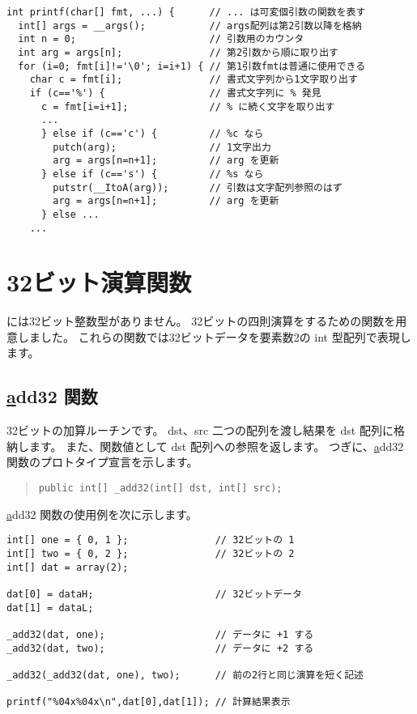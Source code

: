 \begin{mylist}
\begin{verbatim}
int printf(char[] fmt, ...) {      // ... は可変個引数の関数を表す
  int[] args = __args();           // args配列は第2引数以降を格納
  int n = 0;                       // 引数用のカウンタ
  int arg = args[n];               // 第2引数から順に取り出す
  for (i=0; fmt[i]!='\0'; i=i+1) { // 第1引数fmtは普通に使用できる
    char c = fmt[i];               // 書式文字列から1文字取り出す
    if (c=='%') {                  // 書式文字列に % 発見
      c = fmt[i=i+1];              // % に続く文字を取り出す
      ...
      } else if (c=='c') {         // %c なら
        putch(arg);                // 1文字出力
        arg = args[n=n+1];         // arg を更新
      } else if (c=='s') {         // %s なら
        putstr(__ItoA(arg));       // 引数は文字配列参照のはず
        arg = args[n=n+1];         // arg を更新
      } else ...
    ...
\end{verbatim}
\end{mylist}


\section{32ビット演算関数}

\cmml には32ビット整数型がありません。
32ビットの四則演算をするための関数を用意しました。
これらの関数では32ビットデータを要素数2の int 型配列で表現します。

\subsection{\ul add32 関数}

32ビットの加算ルーチンです。
dst、src 二つの配列を渡し結果を dst 配列に格納します。
また、関数値として dst 配列への参照を返します。
つぎに、\ul add32 関数のプロトタイプ宣言を示します。

\begin{quote}
\begin{verbatim}
public int[] _add32(int[] dst, int[] src);
\end{verbatim}
\end{quote}

\ul add32 関数の使用例を次に示します。

\begin{mylist}
\begin{verbatim}
int[] one = { 0, 1 };               // 32ビットの 1
int[] two = { 0, 2 };               // 32ビットの 2
int[] dat = array(2);

dat[0] = dataH;                     // 32ビットデータ
dat[1] = dataL;

_add32(dat, one);                   // データに +1 する
_add32(dat, two);                   // データに +2 する

_add32(_add32(dat, one), two);      // 前の2行と同じ演算を短く記述

printf("%04x%04x\n",dat[0],dat[1]); // 計算結果表示
\end{verbatim}
\end{mylist}

